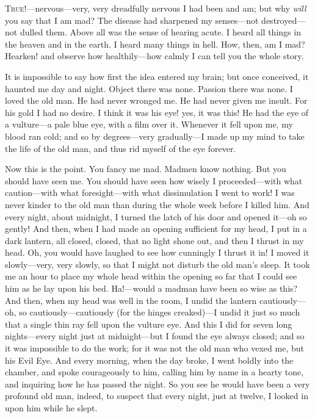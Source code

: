 \documentclass[11pt,a4paper]{article}
\begin{document}
\vspace{1.0em}
\begin{linenumbers}
\noindent\textsc{True!}---nervous---very, very dreadfully nervous I had been and am; but why \emph{will} you say
that I am mad? The disease had sharpened my senses---not destroyed---not dulled them. Above all was the sense of
hearing acute. I heard all things in the heaven and in the earth. I heard many things in hell. How, then, am I
mad? Hearken! and observe how healthily---how calmly I can tell you the whole story.

It is impossible to say how first the idea entered my brain; but once conceived, it haunted me day and night.
Object there was none. Passion there was none. I loved the old man. He had never wronged me. He had never given
me insult. For his gold I had no desire. I think it was his eye! yes, it was this! He had the eye of a
vulture---a pale blue eye, with a film over it. Whenever it fell upon me, my blood ran cold; and so by
degrees---very gradually---I made up my mind to take the life of the old man, and thus rid myself of the eye
forever.

Now this is the point. You fancy me mad. Madmen know nothing. But you should have seen me. You should have seen
how wisely I proceeded---with what caution---with what foresight---with what dissimulation I went to work! I was
never kinder to the old man than during the whole week before I killed him. And every night, about midnight, I
turned the latch of his door and opened it---oh so gently! And then, when I had made an opening sufficient for my
head, I put in a dark lantern, all closed, closed, that no light shone out, and then I thrust in my head. Oh, you
would have laughed to see how cunningly I thrust it in! I moved it slowly---very, very slowly, so that I might
not disturb the old man's sleep. It took me an hour to place my whole head within the opening so far that I could
see him as he lay upon his bed. Ha!---would a madman have been so wise as this? And then, when my head was well in
the room, I undid the lantern cautiously---oh, so cautiously---cautiously (for the hinges creaked)---I undid it
just so much that a single thin ray fell upon the vulture eye. And this I did for seven long nights---every night
just at midnight---but I found the eye always closed; and so it was impossible to do the work; for it was not the
old man who vexed me, but his Evil Eye. And every morning, when the day broke, I went boldly into the chamber, and
spoke courageously to him, calling him by name in a hearty tone, and inquiring how he has passed the night. So you
see he would have been a very profound old man, indeed, to suspect that every night, just at twelve, I looked in
upon him while he slept.


\end{linenumbers}
\end{document}
